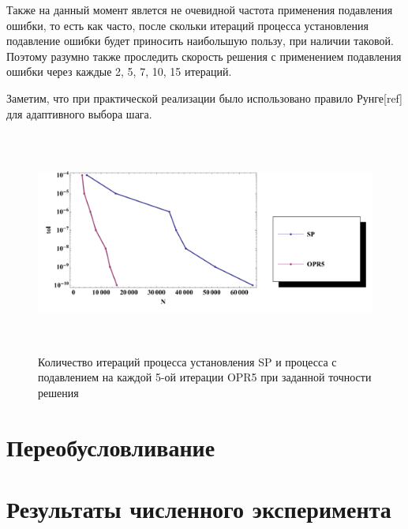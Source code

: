 \documentclass[a4paper,14pt]{extreport}
\begin{document}
  Также на данный момент явлется не очевидной частота применения подавления ошибки, то есть как часто, после скольки итераций процесса установления подавление ошибки будет приносить наибольшую пользу, при наличии таковой. Поэтому разумно также проследить скорость решения с применением подавления ошибки через каждые 2, 5, 7, 10, 15 итераций.
  
  Заметим, что при практической реализации было использовано правило Рунге[ref] для адаптивного выбора шага.
  
    \begin{figure}[H]
	\begin{center}
	\includegraphics[height=7.3cm]{pics/num_ex_1_1.pdf}
	\caption{\small Количество итераций процесса установления SP и процесса с подавлением на каждой 5-ой итерации OPR5 при заданной точности решения}
	\label{region_evals}
	\end{center}
	\end{figure}

  
  
  
  \section{Переобусловливание}
  \label{s:test_precondition}

  
  
  
  \section{Результаты численного эксперимента}
  \label{s:results}
  
  
\newpage
\end{document}
